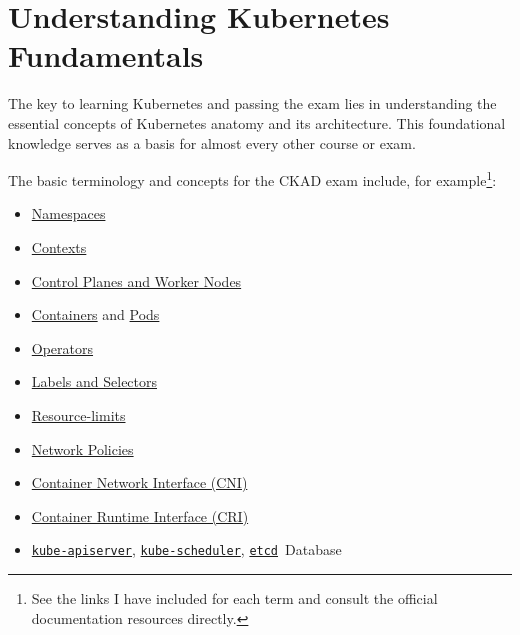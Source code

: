 \section{Understanding Kubernetes Fundamentals}

The key to learning Kubernetes and passing the exam lies in understanding the essential concepts of Kubernetes anatomy and its architecture. This foundational knowledge serves as a basis for almost every other course or exam.

The basic terminology and concepts for the CKAD exam include, for example\footnote{See the links I have included for each term and consult the official documentation resources directly.}:

\begin{multicols}{3}
\begin{itemize}
    \item \href{https://kubernetes.io/docs/concepts/overview/working-with-objects/namespaces/}{Namespaces}
    \item \href{https://kubernetes.io/docs/reference/kubectl/generated/kubectl_config/kubectl_config_use-context/}{Contexts}
    \item \href{https://kubernetes.io/docs/concepts/overview/components/}{Control Planes and Worker Nodes}
    \item \href{https://kubernetes.io/docs/concepts/containers/}{Containers} and \href{https://kubernetes.io/docs/concepts/workloads/pods/}{Pods}
    \item \href{https://kubernetes.io/docs/concepts/scheduling-eviction/assign-pod-node/#operators}{Operators}
    \item \href{https://kubernetes.io/docs/concepts/overview/working-with-objects/labels/}{Labels and Selectors}
    \item \href{https://kubernetes.io/docs/concepts/configuration/manage-resources-containers/}{Resource-limits}
    \item \href{https://kubernetes.io/docs/concepts/services-networking/network-policies/}{Network Policies}
    \item \href{https://kubernetes.io/docs/concepts/extend-kubernetes/compute-storage-net/network-plugins/}{Container Network Interface (CNI)}
    \item \href{https://kubernetes.io/docs/concepts/architecture/cri/}{Container Runtime Interface (CRI)}
    \item \href{https://kubernetes.io/docs/concepts/architecture/#kube-apiserver}{\texttt{kube-apiserver}}, \href{https://kubernetes.io/docs/concepts/architecture/#kube-scheduler}{\texttt{kube-scheduler}}, \href{https://kubernetes.io/docs/concepts/architecture/#kube-scheduler}{\texttt{etcd}}~Database

\end{itemize}
\end{multicols}

